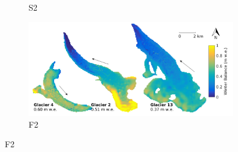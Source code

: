 \documentclass{sfuthesis}
\begin{document}
{\begin{figure}[H]
\begin{subfigure}[b]{0.475\textwidth}
            \caption[]%
            {{\small S2}}    
        \end{subfigure}
        \quad
        \begin{subfigure}[b]{0.475\textwidth}   
            \centering 
            \includegraphics[width=\textwidth]{MLRmap_Modelled_Observed4.png}
            \caption[]%
            {{\small F2}}    
        \end{subfigure}
        

\end{figure}}
\end{document}
